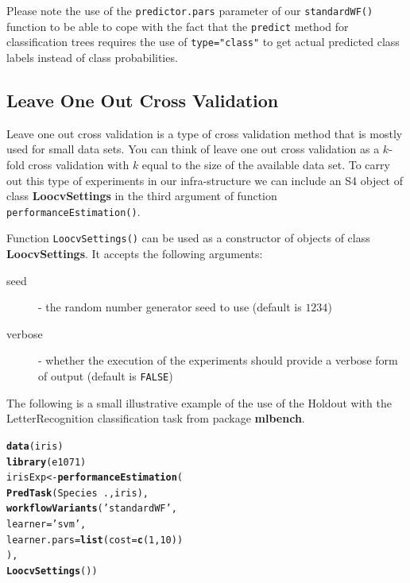 \documentclass[10pt,a4paper]{article}\usepackage[]{graphicx}\usepackage[]{color}
\makeatletter
\newcommand{\hlnum}[1]{\textcolor[rgb]{0.686,0.059,0.569}{#1}}%
\newcommand{\hlstr}[1]{\textcolor[rgb]{0.192,0.494,0.8}{#1}}%
\newcommand{\hlopt}[1]{\textcolor[rgb]{0,0,0}{#1}}%
\newcommand{\hlstd}[1]{\textcolor[rgb]{0.345,0.345,0.345}{#1}}%
\newcommand{\hlkwb}[1]{\textcolor[rgb]{0.69,0.353,0.396}{#1}}%
\newcommand{\hlkwc}[1]{\textcolor[rgb]{0.333,0.667,0.333}{#1}}%
\newcommand{\hlkwd}[1]{\textcolor[rgb]{0.737,0.353,0.396}{\textbf{#1}}}%
\newenvironment{kframe}{%
 \def\at@end@of@kframe{}%
 \ifinner\ifhmode%
  \def\at@end@of@kframe{\end{minipage}}%
  \begin{minipage}{\columnwidth}%
 \fi\fi%
 \def\FrameCommand##1{\hskip\@totalleftmargin \hskip-\fboxsep
 \colorbox{shadecolor}{##1}\hskip-\fboxsep
     \hskip-\linewidth \hskip-\@totalleftmargin \hskip\columnwidth}%
 \MakeFramed {\advance\hsize-\width
   \@totalleftmargin\z@ \linewidth\hsize
   \@setminipage}}%
 {\par\unskip\endMakeFramed%
 \at@end@of@kframe}
\newenvironment{knitrout}{}{} %
\makeatother
\begin{document}
Please note the use of the \texttt{predictor.pars} parameter of our
\texttt{standardWF()} function to be able to cope with the fact that
the \texttt{predict} method for classification trees requires the use
of \texttt{type="class"} to get actual predicted class labels instead
of class probabilities.

\subsection{Leave One Out Cross Validation}

Leave one out cross validation is a type of cross validation method
that is mostly used for small data sets. You can think of leave one
out cross validation as a $k$-fold cross validation with $k$ equal to
the size of the available data set. To carry out this type of
experiments in our infra-structure we can include an S4 object of
class \textbf{LoocvSettings} in the third argument of function
\texttt{performanceEstimation()}.

Function \texttt{LoocvSettings()} can be used as a constructor of
objects of class \textbf{LoocvSettings}. It accepts the following
arguments:

\begin{description}
\item[seed] - the random number generator seed to use (default is $1234$)
\item[verbose] - whether the execution of the experiments should provide a verbose form of output (default is \texttt{FALSE})
\end{description}


The following is a small illustrative example of the use of the
Holdout with the LetterRecognition classification task from package
\textbf{mlbench}.

\begin{knitrout}
\color{fgcolor}\begin{kframe}
\begin{alltt}
\hlkwd{data}\hlstd{(iris)}
\hlkwd{library}\hlstd{(e1071)}
\hlstd{irisExp} \hlkwb{<-} \hlkwd{performanceEstimation}\hlstd{(}
  \hlkwd{PredTask}\hlstd{(Species} \hlopt{~} \hlstd{.,iris),}
  \hlkwd{workflowVariants}\hlstd{(}\hlstr{'standardWF'}\hlstd{,}
           \hlkwc{learner}\hlstd{=}\hlstr{'svm'}\hlstd{,}
           \hlkwc{learner.pars}\hlstd{=}\hlkwd{list}\hlstd{(}\hlkwc{cost}\hlstd{=}\hlkwd{c}\hlstd{(}\hlnum{1}\hlstd{,}\hlnum{10}\hlstd{))}
           \hlstd{),}
  \hlkwd{LoocvSettings}\hlstd{())}
\end{alltt}
\end{kframe}
\end{knitrout}
\end{document}
